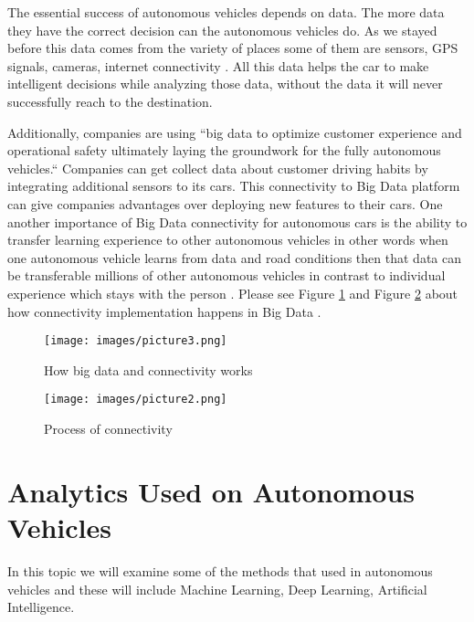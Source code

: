 \documentclass[sigconf]{acmart}
\begin{document}
\par The essential success of autonomous vehicles depends on data. The more data they have the correct decision can the autonomous vehicles do. As we stayed before this data comes from the variety of places some of them are sensors, GPS signals, cameras, internet connectivity \cite{www-webo}. All this data helps the car to make intelligent decisions while analyzing those data, without the data it will never successfully reach to the destination\cite{www-kdnuggets}.

\par Additionally, companies are using ``big data to optimize customer experience and operational safety ultimately laying the groundwork for the fully autonomous vehicles\cite{www-webo}.`` Companies can get collect data about customer driving habits by integrating additional sensors to its cars\cite{www-hb.org}. This connectivity to Big Data platform can give companies advantages over deploying new features to their cars. One another importance of Big Data connectivity for autonomous cars is the ability to transfer learning experience to other autonomous vehicles in other words when one autonomous vehicle learns from data and road conditions then that data can be transferable millions of other autonomous vehicles in contrast to individual experience which stays with the person \cite{www-hb.org}. Please see Figure \ref{fig:connectivity} and Figure \ref{fig:hbsconnectivitysteps} about how connectivity implementation happens in Big Data \cite{www-hb.org}. 

\begin{figure}[!ht]
  \centering
      \texttt{[image: images/picture3.png]}
  \caption{How big data and connectivity works}\label{fig:connectivity}
\end{figure}

\begin{figure}[!ht]
  \centering
      \texttt{[image: images/picture2.png]}
  \caption{Process of connectivity}\label{fig:hbsconnectivitysteps}
\end{figure}


\section{Analytics Used on Autonomous Vehicles}
In this topic we will examine some of the methods that used in autonomous vehicles and these will include Machine Learning, Deep Learning, Artificial Intelligence.
\end{document}
